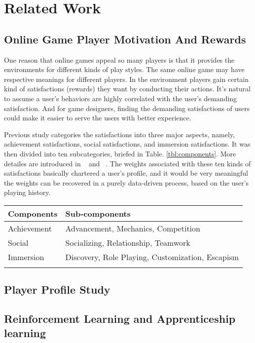 \documentclass[a4paper]{article}
\begin{document}
\section{Related Work}

\subsection{Online Game Player Motivation And Rewards}

One reason that online games appeal so many players is that it provides the environments for different kinds of play styles. The same online game may have respective meanings for different players. In the environment players gain certain kind of satisfactions (rewards) they want by conducting their actions. It's natural to assume a user's behaviors are highly correlated with the user's demanding satisfaction. And for game designers, finding the demanding satisfactions of users could make it easier to serve the users with better experience. 

Previous study categories the satisfactions into three major aspects, namely, achievement satisfactions, social satisfactions, and immersion satisfactions. It was then divided into ten subcategories, briefed in Table. \ref{tbl:components}. More detailes are introduced in ~\cite{} and ~\cite{}. The weights associated with these ten kinds of satisfactions basically chartered a user's profile, and it would be very meaningful the weights can be recovered in a purely data-driven process, based on the user's playing history.


\begin{tabular}{ll}
    \toprule
    Components  &Sub-components \\
    \midrule
    Achievement & Advancement, Mechanics, Competition \\
    Social & Socializing, Relationship, Teamwork \\
    Immersion & Discovery, Role Playing, Customization, Escapism \\
    \bottomrule
    \label{tbl:components}
\end{tabular}

\subsection{Player Profile Study}



\subsection{Reinforcement Learning and Apprenticeship learning}
\end{document}
